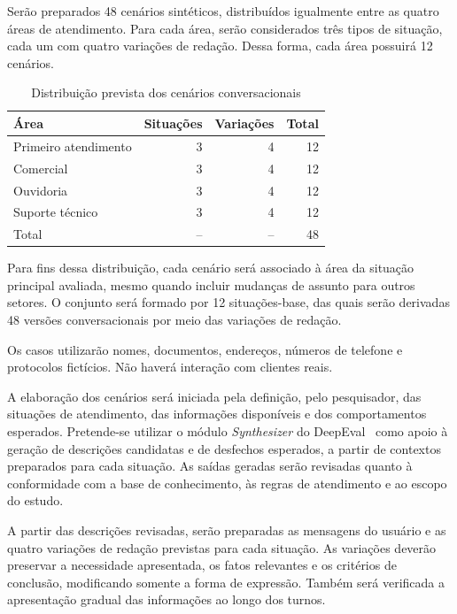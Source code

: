 Serão preparados 48 cenários sintéticos, distribuídos igualmente entre as quatro áreas de atendimento. Para cada área, serão considerados três tipos de situação, cada um com quatro variações de redação. Dessa forma, cada área possuirá 12 cenários.

\begin{table}[htb]
    \ABNTEXfontereduzida
    \centering
    \caption{Distribuição prevista dos cenários conversacionais}
    \label{tab:distribuicao-cenarios}
    \begin{tabular}{l r r r}
        \toprule
        Área & Situações & Variações & Total \\
        \midrule
        Primeiro atendimento & 3 & 4 & 12 \\
        Comercial             & 3 & 4 & 12 \\
        Ouvidoria             & 3 & 4 & 12 \\
        Suporte técnico       & 3 & 4 & 12 \\
        \midrule
        Total & -- & -- & 48 \\
        \bottomrule
    \end{tabular}
    \fonteproprioautor
\end{table}

Para fins dessa distribuição, cada cenário será associado
à área da situação principal avaliada, mesmo quando incluir
mudanças de assunto para outros setores. O conjunto será
formado por 12 situações-base, das quais serão derivadas
48 versões conversacionais por meio das variações de redação.

Os casos utilizarão nomes, documentos, endereços, números de telefone e protocolos fictícios. Não haverá interação com clientes reais.

A elaboração dos cenários será iniciada pela definição, pelo pesquisador, das situações de atendimento, das informações disponíveis e dos comportamentos esperados. Pretende-se utilizar o módulo \textit{Synthesizer} do DeepEval~\cite{deepeval} como apoio à geração de descrições candidatas e de desfechos esperados, a partir de contextos preparados para cada situação. As saídas geradas serão revisadas quanto à conformidade com a base de conhecimento, às regras de atendimento
e ao escopo do estudo.

A partir das descrições revisadas, serão preparadas as mensagens
do usuário e as quatro variações de redação previstas para cada
situação. As variações deverão preservar a necessidade apresentada,
os fatos relevantes e os critérios de conclusão, modificando somente
a forma de expressão. Também será verificada a apresentação gradual
das informações ao longo dos turnos.

